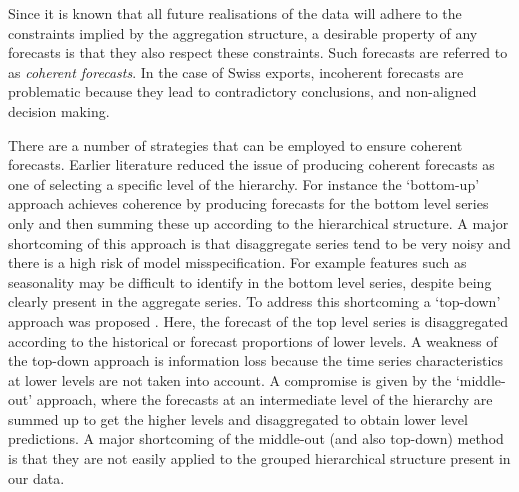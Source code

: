 \documentclass[a4paper,fleqn,11pt]{article}
\begin{document}

Since it is known that all future realisations of the data will adhere to the constraints implied by the aggregation structure, a desirable property of any forecasts is that they also respect these constraints.  Such forecasts are referred to as {\em coherent forecasts}.  In the case of Swiss exports, incoherent forecasts are problematic because they lead to contradictory conclusions, and non-aligned decision making.  

There are a number of strategies that can be employed to ensure coherent forecasts.  Earlier literature reduced the issue of producing coherent forecasts as one of selecting a specific level of the hierarchy. For instance the `bottom-up' approach \citep{Gross1990} achieves coherence by producing forecasts for the bottom level series only and then summing these up according to the hierarchical structure.  A major shortcoming of this approach is that disaggregate series tend to be very noisy and there is a high risk of model misspecification.  For example features such as seasonality may be difficult to identify in the bottom level series, despite being clearly present in the aggregate series.  To address this shortcoming a `top-down' approach was proposed \citep[see][and references therein]{Athanasopoulos2009}.  Here, the forecast of the top level series is disaggregated according to the historical or forecast proportions of lower levels. A weakness of the top-down approach is information loss because the time series characteristics at lower levels are not taken into account. A compromise is given by the `middle-out' approach, where the forecasts at an intermediate level of the hierarchy are summed up to get the higher levels and disaggregated to obtain lower level predictions.  A major shortcoming of the middle-out (and also top-down) method is that they are not easily applied to the grouped hierarchical structure present in our data.
\end{document}
